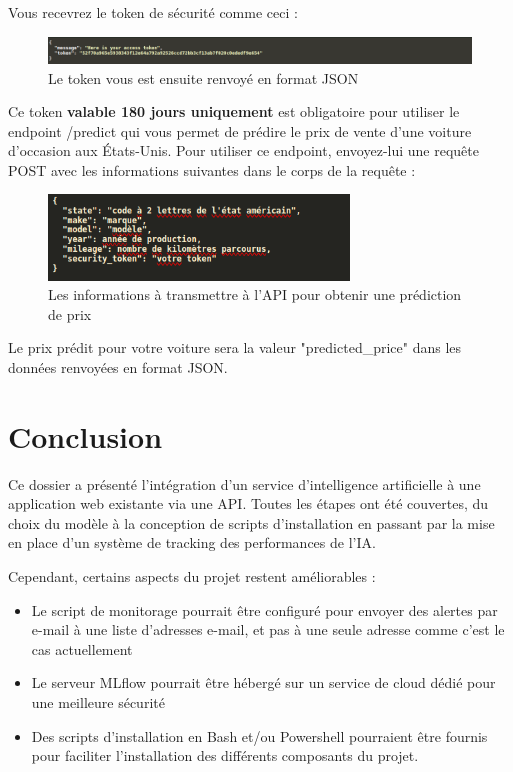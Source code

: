 \documentclass[french]{article}
\begin{document}
    Vous recevrez le token de sécurité comme ceci :

    \begin{figure}[h]
        \includegraphics[width=12cm]{azure_4}
        \centering
        \caption{Le token vous est ensuite renvoyé en format JSON}
    \end{figure}

    Ce token \textbf{valable 180 jours uniquement} est obligatoire pour utiliser le endpoint /predict qui vous permet de prédire le prix de vente d'une voiture d'occasion aux États-Unis. Pour utiliser ce endpoint, envoyez-lui une requête POST avec les informations suivantes dans le corps de la requête :

    \begin{figure}[h]
        \includegraphics[width=8cm]{azure_5}
        \centering
        \caption{Les informations à transmettre à l'API pour obtenir une prédiction de prix}
    \end{figure}

    Le prix prédit pour votre voiture sera la valeur "predicted\_price" dans les données renvoyées en format JSON.


    \section*{Conclusion}
    
    Ce dossier a présenté l'intégration d'un service d'intelligence artificielle à une application web existante via une API. Toutes les étapes ont été couvertes, du choix du modèle à la conception de scripts d'installation en passant par la mise en place d'un système de tracking des performances de l'IA.

    Cependant, certains aspects du projet restent améliorables :
    \begin{itemize}
        \item Le script de monitorage pourrait être configuré pour envoyer des alertes par e-mail à une liste d'adresses e-mail, et pas à une seule adresse comme c'est le cas actuellement
        \item Le serveur MLflow pourrait être hébergé sur un service de cloud dédié pour une meilleure sécurité
        \item Des scripts d'installation en Bash et/ou Powershell pourraient être fournis pour faciliter l'installation des différents composants du projet.
    \end{itemize}


    
\end{document}
